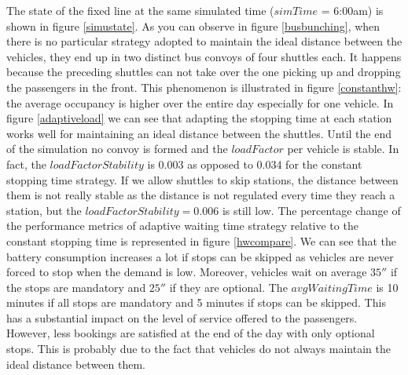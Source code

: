 \documentclass[12pt,a4paper]{article}
\begin{document}
The state of the fixed line at the same simulated time ($simTime$ = 6:00am) is shown in figure \ref{simustate}. As you can observe in figure \ref{busbunching}, when there is no particular strategy adopted to maintain the ideal distance between the vehicles, they end up in two distinct bus convoys of four shuttles each. It happens because the preceding shuttles can not take over the one picking up and dropping the passengers in the front. This phenomenon is illustrated in figure \ref{constanthw}: the average occupancy is higher over the entire day especially for one vehicle. In figure \ref{adaptiveload} we can see that adapting the stopping time at each station works well for maintaining an ideal distance between the shuttles. Until the end of the simulation no convoy is formed and the $loadFactor$ per vehicle is stable. In fact, the $loadFactorStability$ is 0.003 as opposed to 0.034 for the constant stopping time strategy. If we allow shuttles to skip stations, the distance between them is not really stable as the distance is not regulated every time they reach a station, but the $loadFactorStability =  0.006$ is still low.  The percentage change of the performance metrics of adaptive waiting time strategy relative to the constant stopping time is represented in figure \ref{hwcompare}. We can see that the battery consumption increases a lot if stops can be skipped as vehicles are never forced to stop when the demand is low. Moreover, vehicles wait on average $35''$ if the stops are mandatory and $25''$ if they are optional. The $avgWaitingTime$ is 10 minutes if all stops are mandatory and 5 minutes if stops can be skipped. This has a substantial impact on the level of service offered to the passengers. However, less bookings are satisfied at the end of the day with only optional stops. This is probably due to the fact that vehicles do not always maintain the ideal distance between them. 
\end{document}
